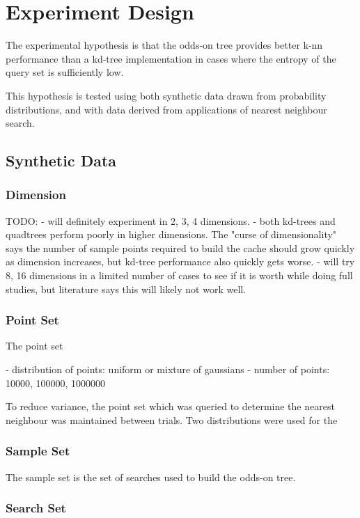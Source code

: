 \documentclass[mcs]{scsthesis}
\begin{document}
\section{Experiment Design}

The experimental hypothesis is that the odds-on tree provides better k-nn
performance than a kd-tree implementation in cases where the entropy of the
query set is sufficiently low.

This hypothesis is tested using both synthetic data drawn from probability
distributions, and with data derived from applications of nearest neighbour
search. 

\subsection{Synthetic Data}

\subsubsection{Dimension}

TODO:
- will definitely experiment in 2, 3, 4 dimensions.
- both kd-trees and quadtrees perform poorly in higher dimensions.  The "curse
of dimensionality" says the number of sample points required to build the cache
should grow quickly as dimension increases, but kd-tree performance also quickly
gets worse.
- will try 8, 16 dimensions in a limited number of cases to see if it is worth
while doing full studies, but literature says this will likely not work well.

\subsubsection{Point Set}

The point set

- distribution of points: uniform or mixture of gaussians
- number of points: 10000, 100000, 1000000 

To reduce variance, the point set which was queried to determine the nearest
neighbour was maintained between trials.  Two distributions were used for the

\subsubsection{Sample Set}

The sample set is the set of searches used to build the odds-on tree.

\subsubsection{Search Set}
\end{document}
